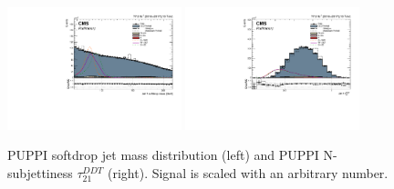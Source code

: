 \begin{figure}[htbp]
\centering
\includegraphics[width=0.450\textwidth]{figures/analysis/search3/B2G-18-002/looseSel_Jet_1_softdrop_mass.pdf}
\includegraphics[width=0.450\textwidth]{figures/analysis/search3/B2G-18-002/looseSel_Jet_1_DDT.pdf}\\
\caption{PUPPI softdrop jet mass distribution (left) and PUPPI N-subjettiness $\tau_{21}^{DDT}$ (right). Signal is scaled with an arbitrary number.}
\label{fig:wtagCP}
\end{figure}
\clearpage
